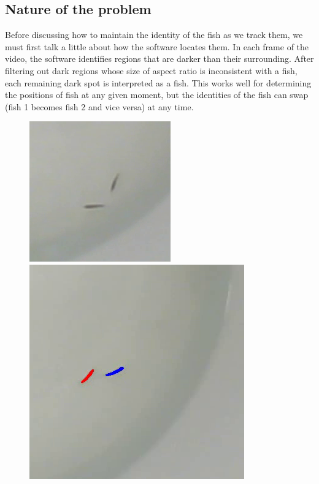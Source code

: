 \documentclass{article}
\newlength{\mylen}
\begin{document}
\subsection{Nature of the problem}

Before discussing how to maintain the identity of the fish as we track them, we must first talk a little about how the software locates them. In each frame of the video, the software identifies regions that are darker than their surrounding. After filtering out dark regions whose size of aspect ratio is inconsistent with a fish, each remaining dark spot is interpreted as a fish. This works well for determining the positions of fish at any given moment, but the identities of the fish can swap (fish 1 becomes fish 2 and vice versa) at any time.

\begin{figure}[H]
	\centering
	\setlength{\mylen}{0.32\linewidth}
	\includegraphics[height=\mylen]{140cropped}%
	\hspace{0.01\linewidth}%
	\includegraphics[height=\mylen]{simple-swap1}%
	\hspace{0.01\linewidth}%

\end{figure}
\end{document}
